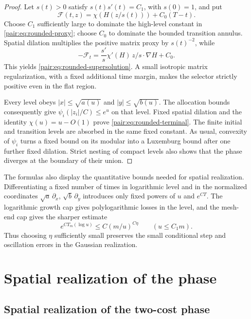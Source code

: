\documentclass[11pt]{article}
\numberwithin{equation}{section}
\begin{document}
\begin{proof}
Let $s(t)>0$ satisfy $s(t)s'(t)=C_1$, with $s(0)=1$, and put
\[
 \mathcal F(t,z)=\chi(H(z/s(t)))+C_0(T-t).
\]
Choose $C_1$ sufficiently large to dominate the high-level constant in
\eqref{pair:eq:rounded-proxy}; choose $C_0$ to dominate the bounded
transition annulus. Spatial dilation multiplies the positive matrix
proxy by $s(t)^{-2}$, while
\[
 -\mathcal F_t
 =\frac{s'}s\chi'(H)\,z/s\cdot\nabla H+C_0.
\]
This yields \eqref{pair:eq:rounded-supersolution}. A small isotropic
matrix regularization, with a fixed additional time margin, makes the
selector strictly positive even in the flat region.

Every level obeys $|x|\le\sqrt{a(u)}$ and $|y|\le\sqrt{b(u)}$.
The allocation bounds consequently give
$\psi_i(|z_i|/C)\le e^u$ on that level. Fixed spatial dilation and the
identity $\chi(u)=u-O(1)$ prove
\eqref{pair:eq:rounded-terminal}. The finite initial and transition
levels are absorbed in the same fixed constant. As usual, convexity of
$\psi_i$ turns a fixed bound on its modular into a Luxemburg bound after
one further fixed dilation. Strict nesting of compact levels also shows
that the phase diverges at the boundary of their union.
\end{proof}

The formulas also display the quantitative bounds needed for spatial
realization. Differentiating a fixed number of times in logarithmic
level and in the normalized coordinates $\sqrt a\,\partial_x$,
$\sqrt b\,\partial_y$ introduces only fixed powers of $u$ and
$e^{CT}$. The logarithmic growth cap gives polylogarithmic losses in the
level, and the mesh-end cap gives the sharper estimate
\[
 e^{CT_m(\log u)}\le C(m/u)^{C\eta}\qquad(u\le C_1m).
\]
Thus choosing $\eta$ sufficiently small preserves the small conditional
step and oscillation errors in the Gaussian realization.



\section{Spatial realization of the phase}

\subsection{Spatial realization of the two-cost phase}
\label{pair:sec:flow-realization}
\end{document}
